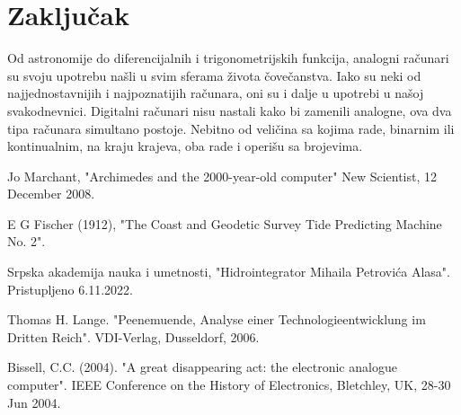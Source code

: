 \documentclass[a4paper]{article}
\begin{document}
	\pagebreak
		
\section{Zaključak}
Od astronomije do diferencijalnih i trigonometrijskih funkcija, analogni računari su svoju upotrebu našli u svim sferama života čovečanstva. Iako su neki od najjednostavnijih i najpoznatijih računara, oni su i dalje u upotrebi u našoj svakodnevnici. Digitalni računari nisu nastali kako bi zamenili analogne, ova dva tipa računara simultano postoje. Nebitno od veličina sa kojima rade, binarnim ili kontinualnim, na kraju krajeva, oba rade i operišu sa brojevima.

\appendix

\begin{thebibliography}{9}



 Jo Marchant, "Archimedes and the 2000-year-old computer" New Scientist, 12 December 2008.

 E G Fischer (1912), "The Coast and Geodetic Survey Tide Predicting Machine No. 2".

 Srpska akademija nauka i umetnosti, "Hidrointegrator Mihaila Petrovića Alasa". Pristupljeno 6.11.2022.

 Thomas H. Lange. "Peenemuende, Analyse einer Technologieentwicklung im Dritten Reich". VDI-Verlag, Dusseldorf, 2006.
			
 Bissell, C.C. (2004). "A great disappearing act: the electronic analogue computer". IEEE Conference on the History of Electronics, Bletchley, UK, 28-30 Jun 2004.


\end{thebibliography}
\end{document}
